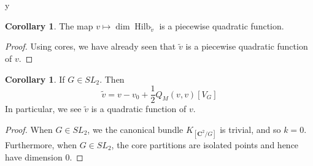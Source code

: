 y\documentclass{amsart}[12pt]
\theoremstyle{definition}
\newtheorem{corollary}[dummy]{Corollary}
\newcommand{\C}{\mathbf{C}}
\DeclareMathOperator{\Hilb}{Hilb}
\begin{document}
\begin{corollary}
The map $v\mapsto \dim\Hilb_{\tilde{v}}$ is a piecewise quadratic function.
\end{corollary}

\begin{proof}
Using cores, we have already seen that $\tilde{v}$ is a piecewise quadratic function of $v$.  
\end{proof}


\begin{corollary}  If $G\in SL_2$. Then
$$\tilde{v}=v-v_0+\frac{1}{2}Q_M(v,v)[V_G]$$
In particular, we see $\tilde{v}$ is a quadratic function of $v$.
\end{corollary}

\begin{proof}
When $G\in SL_2$, we the canonical bundle $K_{[\C^2/G]}$ is trivial, and so $k=0$.  Furthermore, when $G\in SL_2$, the core partitions are isolated points and hence have dimension 0.
\end{proof}












\end{document}
